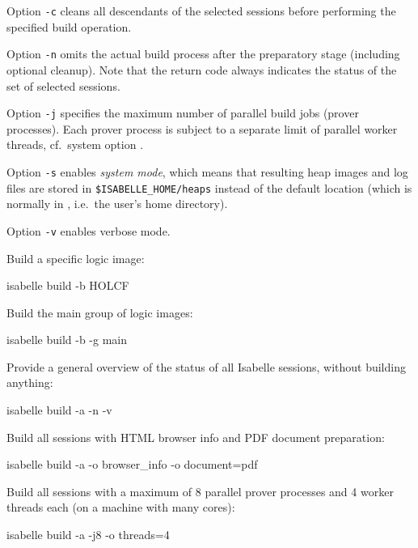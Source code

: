 \begin{isabellebody}
\begin{isamarkuptext}
  \medskip Option \verb|-c| cleans all descendants of the
  selected sessions before performing the specified build operation.

  \medskip Option \verb|-n| omits the actual build process
  after the preparatory stage (including optional cleanup).  Note that
  the return code always indicates the status of the set of selected
  sessions.

  \medskip Option \verb|-j| specifies the maximum number of
  parallel build jobs (prover processes).  Each prover process is
  subject to a separate limit of parallel worker threads, cf.\ system
  option \hyperlink{system option.threads}{\mbox{}}.

  \medskip Option \verb|-s| enables \emph{system mode}, which
  means that resulting heap images and log files are stored in
  \verb|$ISABELLE_HOME/heaps| instead of the default location
  \hyperlink{setting.ISABELLE-OUTPUT}{\mbox{}} (which is normally in \hyperlink{setting.ISABELLE-HOME-USER}{\mbox{}}, i.e.\ the user's home directory).

  \medskip Option \verb|-v| enables verbose mode.%
\end{isamarkuptext}%
\isamarkuptrue%
%
\isamarkuptrue%
%
\begin{isamarkuptext}%
Build a specific logic image:
\begin{ttbox}
isabelle build -b HOLCF
\end{ttbox}

  \smallskip Build the main group of logic images:
\begin{ttbox}
isabelle build -b -g main
\end{ttbox}

  \smallskip Provide a general overview of the status of all Isabelle
  sessions, without building anything:
\begin{ttbox}
isabelle build -a -n -v
\end{ttbox}

  \smallskip Build all sessions with HTML browser info and PDF
  document preparation:
\begin{ttbox}
isabelle build -a -o browser_info -o document=pdf
\end{ttbox}

  \smallskip Build all sessions with a maximum of 8 parallel prover
  processes and 4 worker threads each (on a machine with many cores):
\begin{ttbox}
isabelle build -a -j8 -o threads=4
\end{ttbox}


\end{isamarkuptext}
\end{isabellebody}
